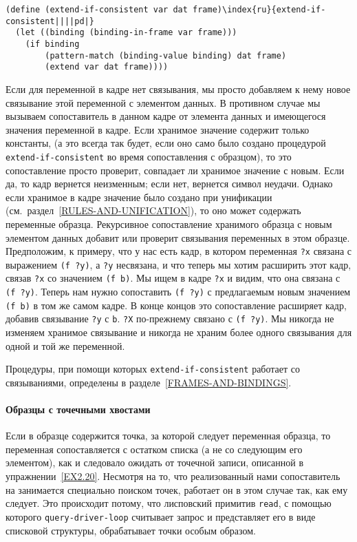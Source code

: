 \begin{Verbatim}[fontsize=\small]
(define (extend-if-consistent var dat frame)\index{ru}{extend-if-consistent||||pd|}
  (let ((binding (binding-in-frame var frame)))
    (if binding
        (pattern-match (binding-value binding) dat frame)
        (extend var dat frame))))
\end{Verbatim}
Если для переменной в кадре нет связывания, мы просто добавляем к нему
новое связывание этой переменной с элементом данных.  В противном случае мы
вызываем сопоставитель в данном кадре от элемента данных и имеющегося значения
переменной в кадре. Если хранимое значение содержит только константы,
(а это всегда так будет, если оно само было создано процедурой
{\tt extend-if-consistent} во время сопоставления с образцом),
то это сопоставление просто проверит, совпадает ли хранимое значение с
новым.  Если да, то кадр вернется неизменным; если нет, вернется
символ неудачи.  Однако если хранимое в кадре значение было создано
при унификации (см.~раздел~\ref{RULES-AND-UNIFICATION}), то
оно может содержать переменные образца.  Рекурсивное сопоставление
хранимого образца с новым элементом данных добавит или проверит
связывания переменных в этом образце.  Предположим, к примеру, что у
нас есть кадр, в котором переменная {\tt ?x} связана с
выражением {\tt (f ?y)}, а {\tt ?y} несвязана, и что
теперь мы хотим расширить этот кадр, связав {\tt ?x} со
значением {\tt (f b)}.  Мы ищем в кадре {\tt ?x} и
видим, что она связана с {\tt (f ?y)}.  Теперь нам нужно
сопоставить {\tt (f ?y)} с предлагаемым новым значением
{\tt (f b)} в том же самом кадре.  В конце концов это
сопоставление расширяет кадр, добавив связывание {\tt ?y} с
{\tt b}.  {\tt ?X} по-прежнему связано с {\tt (f
?y)}.  Мы никогда не изменяем хранимое связывание и никогда не
храним более одного связывания для одной и той же переменной.

Процедуры, при помощи которых
{\tt extend-if-consistent} работает со связываниями, определены
в разделе~\ref{FRAMES-AND-BINDINGS}.

\paragraph{Образцы с точечными хвостами}


Если в образце 
содержится точка, за которой следует
переменная образца, то переменная сопоставляется с остатком списка (а
не со следующим его элементом), как и следовало ожидать от точечной
записи, описанной в упражнении~\ref{EX2.20}.  Несмотря на
то, что реализованный нами сопоставитель на занимается специально
поиском точек, работает он в этом случае так, как ему следует. Это
происходит потому, что лисповский примитив {\tt read}, с
помощью которого {\tt query-driver-loop} считывает запрос и
представляет его в виде списковой структуры, обрабатывает точки особым
образом.

